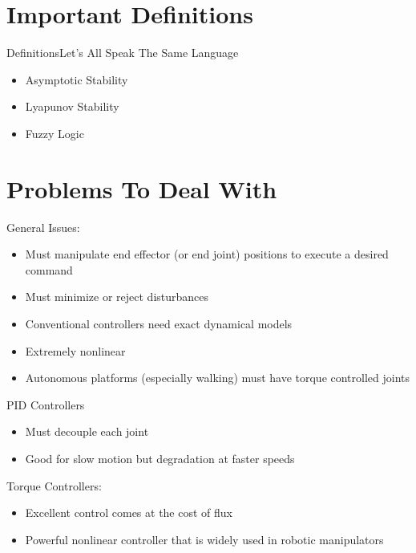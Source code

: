 \documentclass{beamer}
\begin{document}
\section[Definitions]{Important Definitions}
\begin{frame}{Definitions}{Let's All Speak The Same Language}
\begin{itemize}
	\item Asymptotic Stability
	\item Lyapunov Stability
	\item Fuzzy Logic
\end{itemize}
\end{frame}



\section[Problems]{Problems To Deal With}
\begin{frame}\begin{small}
General Issues:
\begin{itemize}
	\item Must manipulate end effector (or end joint) positions to execute a desired command \cite{piltan}
	\item Must minimize or reject disturbances \cite{piltan,6954103}
	\item Conventional controllers need exact dynamical models \cite{piltan}
	\item Extremely nonlinear \cite{SONG2005208,1035149,piltan}
	\item Autonomous platforms (especially walking) must have torque controlled joints \cite{6224628}
\end{itemize}
PID Controllers\cite{SONG2005208}
\begin{itemize}
	\item Must decouple each joint
	\item Good for slow motion but degradation at faster speeds
\end{itemize}
Torque Controllers:
\begin{itemize}
	\item Excellent control comes at the cost of flux \cite{6954103}
	\item Powerful nonlinear controller that is widely used in robotic manipulators
\end{itemize}\end{small}
\end{frame}
\end{document}
